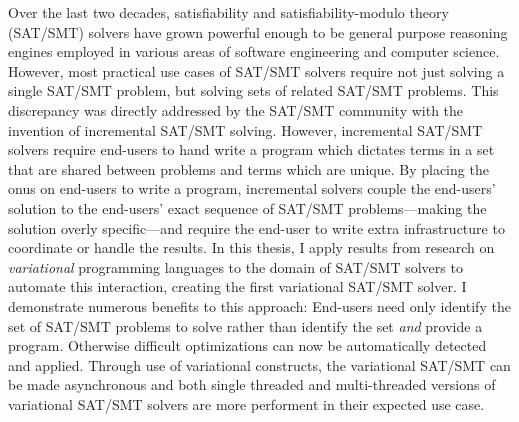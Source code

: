 Over the last two decades, satisfiability and satisfiability-modulo theory
(SAT/SMT) solvers have grown powerful enough to be general purpose reasoning
engines employed in various areas of software engineering and computer science.
However, most practical use cases of SAT/SMT solvers require not just solving a
single SAT/SMT problem, but solving sets of related SAT/SMT problems. This
discrepancy was directly addressed by the SAT/SMT community with the invention
of incremental SAT/SMT solving. However, incremental SAT/SMT solvers require
end-users to hand write a program which dictates terms in a set that are shared
between problems and terms which are unique. By placing the onus on end-users to
write a program, incremental solvers couple the end-users' solution to the
end-users' exact sequence of SAT/SMT problems---making the solution overly
specific---and require the end-user to write extra infrastructure to coordinate
or handle the results. In this thesis, I apply results from research on
\emph{variational} programming languages to the domain of SAT/SMT solvers to
automate this interaction, creating the first variational SAT/SMT solver. I
demonstrate numerous benefits to this approach: End-users need only identify the
set of SAT/SMT problems to solve rather than identify the set \emph{and} provide
a program. Otherwise difficult optimizations can now be automatically detected
and applied. Through use of variational constructs, the variational SAT/SMT can
be made asynchronous and both single threaded and multi-threaded versions of
variational SAT/SMT solvers are more performent in their expected use case.

